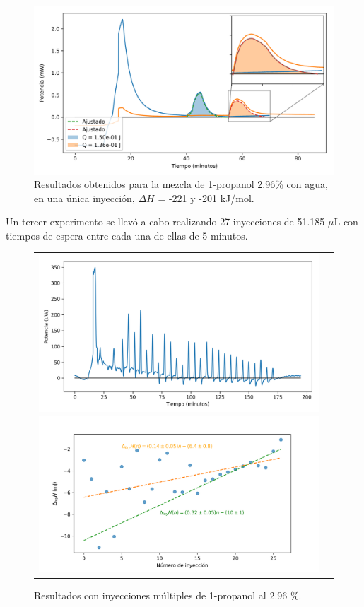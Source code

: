\documentclass[a0]{sciposter}
\newcommand{\figwidth}{0.7\linewidth}
\begin{document}
\begin{multicols}{3}
	\begin{figure}[h]
		\centering
		\includegraphics[width=\figwidth]{../Data/ChemicalCalibrations/singlePropanol}
		\caption{Resultados obtenidos para la mezcla de 1-propanol 2.96\% con agua, en una \'unica inyecci\'on, $\Delta H$ = -221 y -201 kJ/mol.}
	\end{figure}

	Un tercer experimento se llev\'o a cabo realizando 27 inyecciones de 51.185 $\mu$L con tiempos de espera entre cada una de ellas de 5 minutos.
	
	\begin{figure}[h]
		\centering
		\begin{tabular}{cc}
			\includegraphics[width=0.47\linewidth]{../Data/ChemicalCalibrations/multiple}
			\includegraphics[width=0.53\linewidth]{../Data/ChemicalCalibrations/multipleInt}
		\end{tabular}
		\caption{Resultados con inyecciones m\'ultiples de 1-propanol al 2.96 \%.}
	\end{figure}


\end{multicols}
\end{document}
